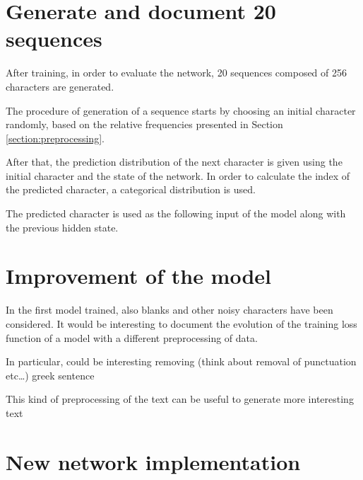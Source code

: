 \documentclass[a4paper,12pt]{article} %
\begin{document}
	\section{Generate and document 20 sequences}
	After training, in order to evaluate the network, 20 sequences composed of 
	256 characters are generated.\bigskip
	
	The procedure of generation of a sequence starts by choosing an initial 
	character randomly, based on the relative frequencies presented in Section 
	\ref{section:preprocessing}.
	
	After that, the prediction distribution of the next character is given 
	using the initial character and the state of the network. In order to 
	calculate the index of the predicted character, a categorical distribution 
	is used. 
	
	The predicted character is used as the following input of the model along 
	with the previous hidden state.
	
	\section{Improvement of the model}
	In the first model trained, also blanks and other noisy characters have 
	been considered. It would be interesting to document the evolution of the 
	training loss function of a model with a different preprocessing of data.
	
	In particular, could be interesting removing 
	(think about removal of punctuation etc…)
	greek sentence
	
	This kind of preprocessing of the text can be useful to generate more
	interesting text 
	
	
	\section{New network implementation}
	
	
\end{document}
